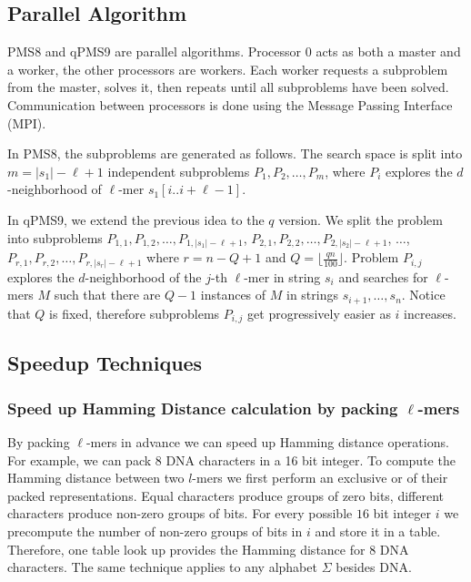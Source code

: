 \subsection{Parallel Algorithm}

PMS8 and qPMS9 are parallel algorithms. Processor $0$ acts as both a master and
a worker, the other processors are workers. Each worker requests a subproblem from the
master, solves it, then repeats until all subproblems have been solved.
Communication between processors is done using the Message Passing Interface
(MPI). 

In PMS8, the subproblems are generated as follows. The search
space is split into $m=|s_1|-\ell+1$ independent subproblems $P_1, P_2,\ldots,
P_m$, where $P_i$ explores the $d$-neighborhood of $\ell$-mer $s_1[i..i+\ell-1]$.

In qPMS9, we extend the previous idea to the $q$ version. We split the
problem into subproblems $P_{1,1}, P_{1,2}, \ldots, P_{1,|s_1|-\ell+1}$,
$P_{2,1}, P_{2,2}, \ldots, P_{2,|s_2|-\ell+1}$, $\ldots$, $P_{r,1},
P_{r,2},\ldots,P_{r,|s_r|-\ell+1}$ where $r=n-Q+1$ and
$Q=\lfloor\frac{qn}{100}\rfloor$.
Problem $P_{i,j}$ explores the $d$-neighborhood of the $j$-th $\ell$-mer in string 
$s_i$ and searches for $\ell$-mers $M$ such that there are $Q-1$
instances of $M$ in strings $s_{i+1},\ldots,s_n$. Notice that $Q$ is
fixed, therefore subproblems $P_{i,j}$ get progressively easier as $i$
increases.


\subsection{Speedup Techniques}

\subsubsection{Speed up Hamming Distance calculation by packing $\ell$-mers}
\label{secCompressLmers}
By packing $\ell$-mers in advance we can speed up Hamming distance
operations. For example, we can pack 8 DNA characters in a 16 bit integer.
To compute the Hamming distance between two $l$-mers we first
perform an exclusive or of their packed representations. Equal
characters produce groups of zero bits, different characters produce
non-zero groups of bits.
For every possible $16$ bit integer $i$ we precompute the number of non-zero groups of bits
in $i$ and store it in a table. Therefore, one table look up provides the
Hamming distance for 8 DNA characters.  The same
technique applies to any alphabet $\Sigma$ besides DNA.

